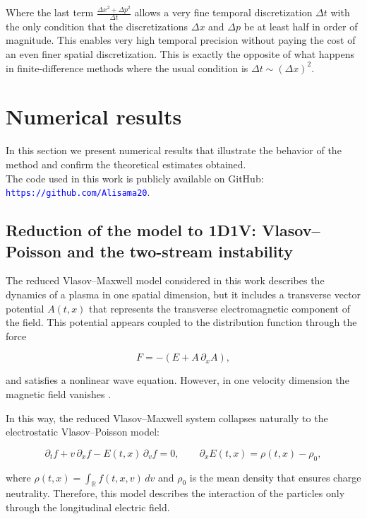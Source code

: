\documentclass[11pt,a4paper,twoside,pdf]{article}
\numberwithin{equation}{section}
\begin{document}
Where the last term $\frac{\Delta x^2 + \Delta p^2}{\Delta t}$ allows a very fine temporal discretization $\Delta t$ with the only condition that the discretizations $\Delta x$ and $\Delta p$ be at least half in order of magnitude. This enables very high temporal precision without paying the cost of an even finer spatial discretization. This is exactly the opposite of what happens in finite-difference methods where the usual condition is $\Delta t \sim \left( \Delta x \right)^2$.




\section{Numerical results}

In this section we present numerical results that illustrate the
behavior of the method and confirm the theoretical estimates obtained.\\

The code used in this work is publicly available on GitHub: \textcolor{blue}{\texttt{https://github.com/Alisama20}}.



\subsection{Reduction of the model to 1D1V: Vlasov--Poisson and the two-stream instability}



The reduced Vlasov--Maxwell model considered in this work describes the
dynamics of a plasma in one spatial dimension, but it includes a transverse vector
potential $A(t,x)$ that represents the transverse electromagnetic component of the
field. This potential appears coupled to the distribution function through the
force


\[
F = -\left(E + A\,\partial_x A\right),
\]


and satisfies a nonlinear wave equation. However, in one velocity dimension the magnetic field vanishes \cite{martin2021campo}.

In this way, the reduced Vlasov--Maxwell system collapses
naturally to the electrostatic Vlasov--Poisson model:


\[
\partial_t f + v\,\partial_x f - E(t,x)\,\partial_v f = 0,
\qquad
\partial_x E(t,x) = \rho(t,x) - \rho_0,
\]


where $\rho(t,x)=\int_{\mathbb{R}} f(t,x,v)\,dv$ and $\rho_0$ is the mean density that ensures charge neutrality.
Therefore, this model describes the interaction of the particles only through the longitudinal
electric field.\\
\end{document}
